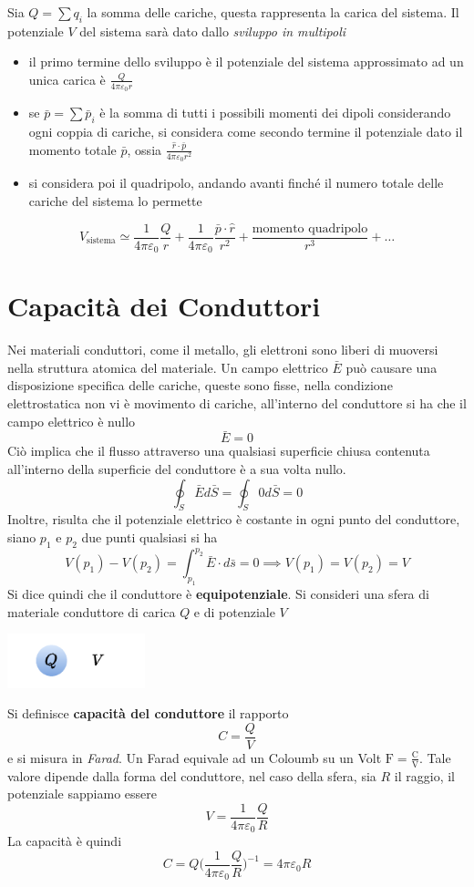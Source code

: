 \documentclass[10pt, letterpaper]{report}
\begin{document}
Sia $Q=\sum q_i$ la somma delle cariche, questa rappresenta la carica del sistema. Il potenziale $V$ del sistema sarà dato dallo \textit{sviluppo in multipoli}\begin{itemize}
    \item il primo termine dello sviluppo è il potenziale del sistema approssimato ad un unica carica è $\frac{Q}{4\pi\varepsilon_0 r}$
    \item se $\bar p=\sum \bar p_i$ è la somma di tutti i possibili momenti dei dipoli considerando ogni coppia di cariche, si considera come secondo termine il potenziale dato il momento totale $\bar p$, ossia $\frac{\hat r \cdot \bar p}{4\pi\varepsilon_0 r^2}$
    \item si considera poi il quadripolo, andando avanti finché il numero totale delle cariche del sistema lo permette 
\end{itemize}
$$ V_{\text{sistema}}\simeq \frac{1}{4\pi\varepsilon_0}\frac{Q}{r}+ \frac{1}{4\pi\varepsilon_0}\frac{\bar p\cdot  \hat r}{r^2}+\frac{\text{momento quadripolo}}{r^3}+\dots$$
\flowerLine 
\section{Capacità dei Conduttori}
Nei materiali conduttori, come il metallo, gli elettroni sono liberi di muoversi nella struttura atomica del materiale. Un campo elettrico $\bar E$ può causare una disposizione specifica delle cariche, queste sono fisse, nella condizione elettrostatica non vi è movimento di cariche, all'interno del conduttore si ha che il campo elettrico è nullo 
$$\bar E = 0$$
Ciò implica che il flusso attraverso una qualsiasi superficie chiusa contenuta all'interno della superficie del conduttore è a sua volta nullo. 
$$ \oint_S \bar E d\bar S =  \oint_S 0 d\bar S = 0$$ 
Inoltre, risulta che il potenziale elettrico è costante in ogni punto del conduttore, siano $p_1$ e $p_2$ due punti qualsiasi si ha 
$$ V(p_1)-V(p_2)=\int_{p_1}^{p_2}\bar E \cdot d\bar s=0 \implies V(p_1)=V(p_2)= V$$
Si dice quindi che il conduttore è \textbf{equipotenziale}. Si consideri una sfera di materiale conduttore di carica $Q$ e di potenziale $V$
\begin{center}
    \includegraphics[width=0.3\textwidth]{images/sferaPot.pdf}
\end{center} 
Si definisce \textbf{capacità del conduttore} il rapporto 
$$ C=\frac{Q}{V}$$ 
e si misura in \textit{Farad}. Un Farad equivale ad un Coloumb su un Volt $\text{F}=\frac{\text{C}}{\text{V}}$.
Tale valore dipende dalla forma del conduttore, nel caso della sfera, sia $R$ il raggio, il potenziale sappiamo essere 
$$V=\frac{1}{4\pi\varepsilon_0}\frac{Q}{R}$$
La capacità è quindi 
$$ C=Q\Big(\frac{1}{4\pi\varepsilon_0}\frac{Q}{R} \Big)^{-1}=4\pi\varepsilon_0 R$$
\end{document}
